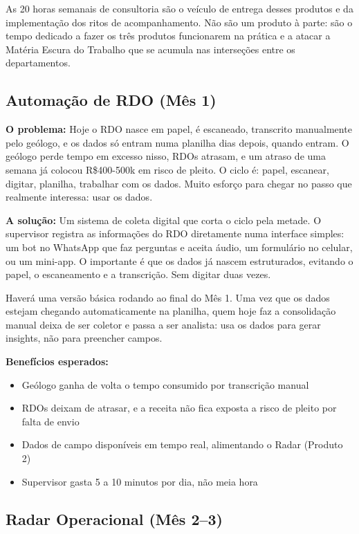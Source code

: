 \documentclass[12pt,a4paper]{scrartcl}
\begin{document}
As 20 horas semanais de consultoria são o veículo de entrega desses produtos e da implementação dos ritos de acompanhamento. Não são um produto à parte: são o tempo dedicado a fazer os três produtos funcionarem na prática e a atacar a Matéria Escura do Trabalho que se acumula nas interseções entre os departamentos.

\subsection{Automação de RDO (Mês 1)}

\textbf{O problema:} Hoje o RDO nasce em papel, é escaneado, transcrito manualmente pelo geólogo, e os dados só entram numa planilha dias depois, quando entram. O geólogo perde tempo em excesso nisso, RDOs atrasam, e um atraso de uma semana já colocou R\$400-500k em risco de pleito. O ciclo é: papel, escanear, digitar, planilha, trabalhar com os dados. Muito esforço para chegar no passo que realmente interessa: usar os dados.

\textbf{A solução:} Um sistema de coleta digital que corta o ciclo pela metade. O supervisor registra as informações do RDO diretamente numa interface simples: um bot no WhatsApp que faz perguntas e aceita áudio, um formulário no celular, ou um mini-app. O importante é que os dados já nascem estruturados, evitando o papel, o escaneamento e a transcrição. Sem digitar duas vezes.

Haverá uma versão básica rodando ao final do Mês 1. Uma vez que os dados estejam chegando automaticamente na planilha, quem hoje faz a consolidação manual deixa de ser coletor e passa a ser analista: usa os dados para gerar insights, não para preencher campos.

\textbf{Benefícios esperados:}
\begin{itemize}
  \item Geólogo ganha de volta o tempo consumido por transcrição manual
  \item RDOs deixam de atrasar, e a receita não fica exposta a risco de pleito por falta de envio
  \item Dados de campo disponíveis em tempo real, alimentando o Radar (Produto 2)
  \item Supervisor gasta 5 a 10 minutos por dia, não meia hora
\end{itemize}

\subsection{Radar Operacional (Mês 2--3)}
\end{document}
